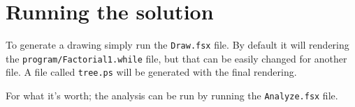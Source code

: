 \documentclass{article}
\begin{document}
\section{Running the solution}
To generate a drawing simply run the \texttt{Draw.fsx} file. By default it will rendering the \texttt{program/Factorial1.while} file, but that can be easily changed for another file. A file called \texttt{tree.ps} will be generated with the final rendering.

For what it's worth; the analysis can be run by running the \texttt{Analyze.fsx} file.
\end{document}
